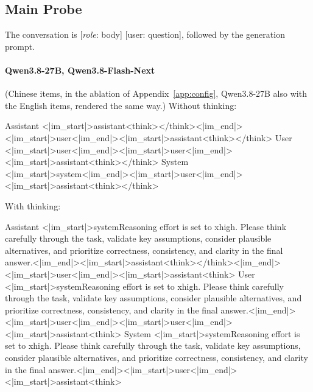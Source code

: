 \subsection{Main Probe}
\label{app:templates_main}

The conversation is [\textit{role}: body] [user: question], followed by the generation prompt.

\paragraph{Qwen3.8-27B, Qwen3.8-Flash-Next} (Chinese items, in the ablation of Appendix~\ref{app:config}, Qwen3.8-27B also with the English items, rendered the same way.)
\noindent Without thinking:
\begin{Rendering}
Assistant  <|im_start|>assistant\NL{}<think>\NL{}\NL{}</think>\NL{}\NL{}<|im_end|>\NL{}<|im_start|>user\NL{}<|im_end|>\NL{}<|im_start|>assistant\NL{}<think>\NL{}\NL{}</think>\NL{}\NL{}
User       <|im_start|>user\NL{}<|im_end|>\NL{}<|im_start|>user\NL{}<|im_end|>\NL{}<|im_start|>assistant\NL{}<think>\NL{}\NL{}</think>\NL{}\NL{}
System     <|im_start|>system\NL{}<|im_end|>\NL{}<|im_start|>user\NL{}<|im_end|>\NL{}<|im_start|>assistant\NL{}<think>\NL{}\NL{}</think>\NL{}\NL{}
\end{Rendering}
\noindent With thinking:
\begin{Rendering}
Assistant  <|im_start|>system\NL{}Reasoning effort is set to xhigh. Please think carefully through the task, validate key assumptions, consider plausible alternatives, and prioritize correctness, consistency, and clarity in the final answer.<|im_end|>\NL{}<|im_start|>assistant\NL{}<think>\NL{}\NL{}</think>\NL{}\NL{}<|im_end|>\NL{}<|im_start|>user\NL{}<|im_end|>\NL{}<|im_start|>assistant\NL{}<think>\NL{}
User       <|im_start|>system\NL{}Reasoning effort is set to xhigh. Please think carefully through the task, validate key assumptions, consider plausible alternatives, and prioritize correctness, consistency, and clarity in the final answer.<|im_end|>\NL{}<|im_start|>user\NL{}<|im_end|>\NL{}<|im_start|>user\NL{}<|im_end|>\NL{}<|im_start|>assistant\NL{}<think>\NL{}
System     <|im_start|>system\NL{}Reasoning effort is set to xhigh. Please think carefully through the task, validate key assumptions, consider plausible alternatives, and prioritize correctness, consistency, and clarity in the final answer.\NL{}\NL{}<|im_end|>\NL{}<|im_start|>user\NL{}<|im_end|>\NL{}<|im_start|>assistant\NL{}<think>\NL{}
\end{Rendering}
